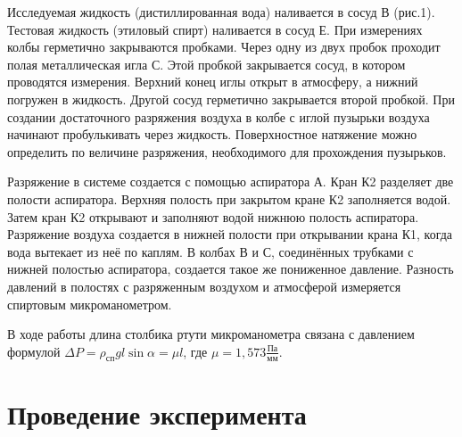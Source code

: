 \documentclass[14pt, a4paper]{report}
\begin{document}
Исследуемая жидкость (дистиллированная вода) наливается в сосуд В (рис.1). Тестовая жидкость (этиловый спирт) наливается в сосуд Е. При измерениях колбы герметично закрываются пробками. Через одну из двух пробок проходит полая металлическая игла С. Этой пробкой закрывается сосуд, в котором проводятся измерения. Верхний конец иглы открыт в атмосферу, а нижний погружен в жидкость. Другой сосуд герметично закрывается второй пробкой. При создании достаточного разряжения воздуха в колбе с иглой пузырьки воздуха начинают пробулькивать через жидкость. Поверхностное натяжение можно определить по величине разряжения, необходимого для прохождения пузырьков.

Разряжение в системе создается с помощью аспиратора А. Кран К2 разделяет две полости аспиратора. Верхняя полость при закрытом кране К2 заполняется водой. Затем кран К2 открывают и заполняют водой нижнюю полость аспиратора. Разряжение воздуха создается в нижней полости при открывании крана К1, когда вода вытекает из неё по каплям. В колбах В и С, соединённых трубками с нижней полостью аспиратора, создается такое же пониженное давление. Разность давлений в полостях с разряженным воздухом и атмосферой измеряется спиртовым микроманометром.

В ходе работы длина столбика ртути микроманометра связана с давлением формулой $\Delta P=\rho_{сп}gl\sin\alpha=\mu l$, где $\mu=1,573\frac{Па}{мм}$.

\section{Проведение эксперимента}
\end{document}
